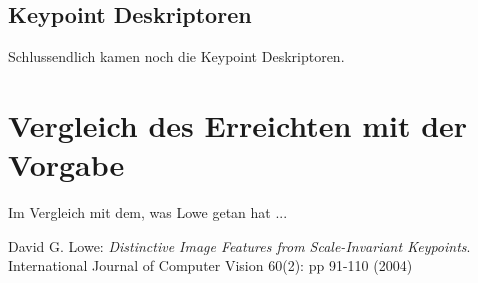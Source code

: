 \documentclass[a4paper,12pt]{scrartcl}
\begin{document}
\subsection{Keypoint Deskriptoren}
Schlussendlich kamen noch die Keypoint Deskriptoren.

% 
% 
% 
% 
% 
% 
% 
% 
% 
% 
% 

\section{Vergleich des Erreichten mit der Vorgabe}
Im Vergleich mit dem, was Lowe \cite{Lowe} getan hat ...

\newpage
\begin{thebibliography}{------}
  David G. Lowe: {\em Distinctive Image Features from Scale-Invariant Keypoints}. 
  International Journal of Computer Vision 60(2): pp 91-110 (2004)
\end{thebibliography}
\end{document}
